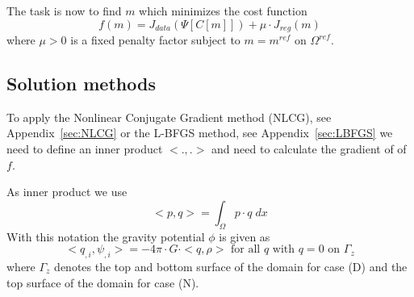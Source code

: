 The task is now to find $m$ which minimizes the cost function
\begin{equation}\label{GRAV:EQU:103}
f(m) =  J_{data}(\Psi[C[m]]) +  \mu \cdot J_{reg}(m)
\end{equation} 
where $\mu>0$ is a fixed penalty factor subject to $m=m^{ref}$ on $\Omega^{ref}$.

\subsection{Solution methods}
To apply the Nonlinear Conjugate Gradient method (NLCG), see Appendix~\ref{sec:NLCG} or the L-BFGS method, see Appendix~\ref{sec:LBFGS} we need
to define an inner product $<.,.>$ and need to calculate the gradient of of $f$. 

As inner product we use 
\begin{equation}\label{GRAV:EQU:200}
<p,q> = \int_{\Omega} p \cdot q \; dx
\end{equation} 
With this notation the gravity potential $\phi$ is given as
\begin{equation}\label{GRAV:EQU:201}
< q_{,i},\psi_{,i} > = - 4\pi \cdot G \cdot  < q , \rho > \mbox{ for all } q \mbox{ with } q=0 \mbox{ on } \Gamma_{z}
\end{equation} 
where $\Gamma_{z}$ denotes the top and bottom surface of the domain for case (D)
and the top surface of the domain for case (N). 



